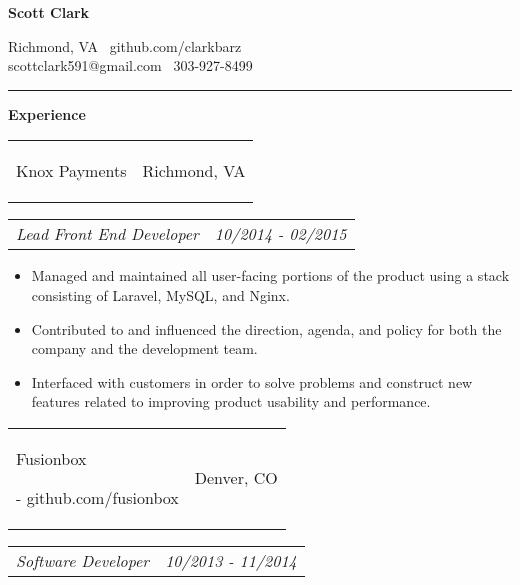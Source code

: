 \documentclass[11pt]{article}
\makeatletter
\newcommand{\headerrow}[2]
{\begin{tabular*}{\linewidth}{l@{\extracolsep{\fill}}r}
	#1 &
	#2 \\
\end{tabular*}}
\makeatother
\begin{document}
\begin{center}
	\begin{huge}
		\bf Scott Clark
	\end{huge}
	
	\large Richmond, VA \textbullet\ github.com/clarkbarz \\
	\large scottclark591@gmail.com \textbullet\ 303-927-8499 \\
\end{center}

\vspace{-0.5em}
\hrule
\vspace{0.8em}

\begin{LARGE}
	\bf Experience
\end{LARGE}

\vspace{0.5em}
\headerrow
	{\begin{Large}Knox Payments\end{Large}}
	{Richmond, VA}
\headerrow
	{\textit{Lead Front End Developer}}
	{\textit{10/2014 - 02/2015}}
	
\vspace{-0.8em}
\begin{itemize}
	\item Managed and maintained all user-facing portions of the product using a stack consisting of Laravel, MySQL, and Nginx.
	\vspace{-0.6em}
	\item Contributed to and influenced the direction, agenda, and policy for both the company and the development team.
	\vspace{-0.6em}
	\item Interfaced with customers in order to solve problems and construct new features related to improving product usability and performance.
\end{itemize}

\vspace{-0.6em}

\vspace{0.5em}
\headerrow
	{\begin{Large}Fusionbox\end{Large} - github.com/fusionbox}
	{Denver, CO}
\headerrow
	{\textit{Software Developer}}
	{\textit{10/2013 - 11/2014}}
	
\end{document}
